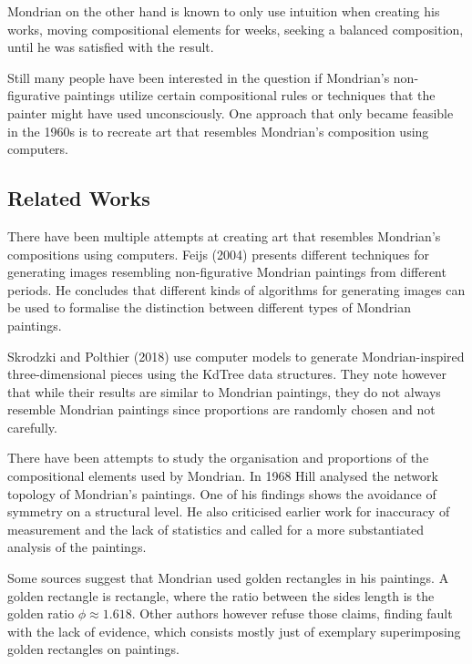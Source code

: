 \documentclass[serif,article,noparskip]{agse-thesis}
\begin{document}
Mondrian on the other hand is known to only use intuition when creating his
works, moving compositional elements for weeks, seeking a balanced composition,
until he was satisfied with the result.


Still many people have been interested in the question if Mondrian's
non-figurative paintings utilize certain compositional rules or techniques that
the painter might have used unconsciously. One approach that only became
feasible in the 1960s is to recreate art that resembles Mondrian's composition
using computers.

\subsection{Related Works}

There have been multiple attempts at creating art that resembles Mondrian's
compositions using computers. Feijs (2004)\cite{Feijs2004} presents different
techniques for generating images resembling non-figurative Mondrian paintings
from different periods. He concludes that different kinds of algorithms for
generating images can be used to formalise the distinction between different
types of Mondrian paintings.

Skrodzki and Polthier (2018) \cite{Skrodzki2018} use computer models to generate
Mondrian-inspired three-dimensional pieces using the KdTree data structures.
They note however that while their results are similar to Mondrian paintings,
they do not always resemble Mondrian paintings since proportions are randomly
chosen and not carefully.

There have been attempts to study the organisation and proportions of the
compositional elements used by Mondrian. In 1968 Hill \cite{Hill1968} analysed
the network topology of Mondrian's paintings. One of his findings shows the
avoidance of symmetry on a structural level. He also criticised earlier work for
inaccuracy of measurement and the lack of statistics and called for a more
substantiated analysis of the paintings.

Some sources \cite{bouleau1963,bergamini1980} suggest that Mondrian used golden
rectangles in his paintings. A golden rectangle is rectangle, where the ratio
between the sides length is the golden ratio $\phi \approx 1.618$. Other authors
however \cite{Livio2002,Markowsky1992} refuse those claims, finding fault with
the lack of evidence, which consists mostly just of exemplary superimposing
golden rectangles on paintings.
\end{document}
